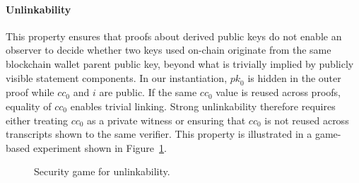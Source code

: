 \paragraph{Unlinkability}
This property ensures that proofs about derived public keys do not enable an observer to decide whether two keys used on-chain originate from the same blockchain wallet parent public key, beyond what is trivially implied by publicly visible statement components. 
In our instantiation, $\mathit{pk}_0$ is hidden in the outer proof while $\mathit{cc}_0$ and $\mathit{i}$ are public. If the same $\mathit{cc}_0$ value is reused across proofs, equality of $\mathit{cc}_0$ enables trivial linking. Strong unlinkability therefore requires either treating $\mathit{cc}_0$ as a private witness or ensuring that $\mathit{cc}_0$ is not reused across transcripts shown to the same verifier. This property is illustrated in a game-based experiment shown in Figure~\ref{fig:game-unlinkability}.

\begin{figure}[t]
	\centering
	\begin{gameproof}[name=\mathsf{Exp}^{\mathsf{UL}}, arg=(1^{\lambda}), nr=0]
		\makeatletter
		\renewcommand\@pc@gametitle[1][]{\ensuremath{\pcgame[\mathcal{A}]\gameprocedurearg}}
		\makeatother
	\end{gameproof}
	\caption{Security game for unlinkability.}
	\label{fig:game-unlinkability}
\end{figure}

